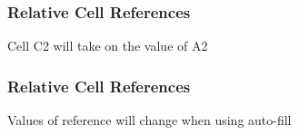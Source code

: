 \documentclass[color=usenames,dvipsnames]{beamer}
\begin{document}
\begin{frame}
  \frametitle{Relative Cell References}
  \begin{center}
    Cell C2 will take on the value of A2 \\
  \end{center}
\end{frame}


\begin{frame}
  \frametitle{Relative Cell References}
  \begin{center}
    Values of reference will change when using auto-fill
  \end{center}
\end{frame}
\end{document}
